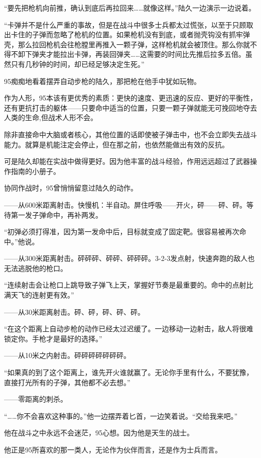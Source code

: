 “要先把枪机向前推，确认到底后再拉回来……就像这样。”陆久一边演示一边说着。

“卡弹并不是什么严重的事故，但是在战斗中很多士兵都太过慌张，以至于只顾取出卡住的子弹而忽略了枪机的位置。如果枪机没有到底，或者抛壳钩没有抓牢弹壳，那么拉回枪机会往枪膛里再推入一颗子弹，这样枪机就会被顶住。那么你就不得不卸下弹夹才能拉出卡弹，再装回弹夹……这需要的时间比先推后拉多五倍。虽然只有几秒钟的时间，却已经足够决定生死。”

95痴痴地看着摆弄自动步枪的陆久，那把枪在他手中犹如玩物。

作为人形，95本该有更优秀的素质：更快的速度、更迅速的反应、更好的平衡性，还有更抗打击的躯体——只要命中适当的位置，只要一颗子弹就能无可挽回地夺去人类的生命,但战术人形不会。

除非直接命中大脑或者核心，其他位置的话即使被子弹击中，也不会立即失去战斗能力。就算是机能注定会停止，但在那之前，也依然能做出有效的反抗。

可是陆久却能在实战中做得更好。因为他丰富的战斗经验，作用远远超过了武器操作指南的小册子。

协同作战时，95曾悄悄留意过陆久的动作。

——从600米距离射击。快慢机：半自动。屏住呼吸——开火，砰——砰、砰。等待第一发子弹命中，再补两发。

“初弹必须打得准，因为第一发命中后，目标就变成了固定靶。很容易被再次命中。”他说。

——从300米距离射击。砰砰砰、砰砰、砰砰砰。3-2-3发点射，快速奔跑的敌人也无法逃脱他的枪口。

“连续射击会让枪口上跳导致子弹飞上天，掌握好节奏是最重要的。命中的点射比满天飞的连射更有效。”

——从30米距离射击。砰、砰，砰、砰、砰。

“在这个距离上自动步枪的动作已经太过迟缓了。一边移动一边射击，敌人将很难锁定你。手枪才是最好的选择。”

——从10米之内射击。砰砰砰砰砰砰砰。

“如果真的到了这个距离上，谁先开火谁就赢了。无论你手里有什么，不要犹豫，直接打光所有的子弹，其他都不必去想。”

——零距离的刺杀。

“……你不会喜欢这种事的。”他一边摆弄着匕首，一边笑着说。“交给我来吧。”

他在战斗之中永远不会迷茫，95心想。因为他是天生的战士。

他正是95所喜欢的那一类人，无论作为伙伴而言，还是作为士兵而言。

\section*{}

